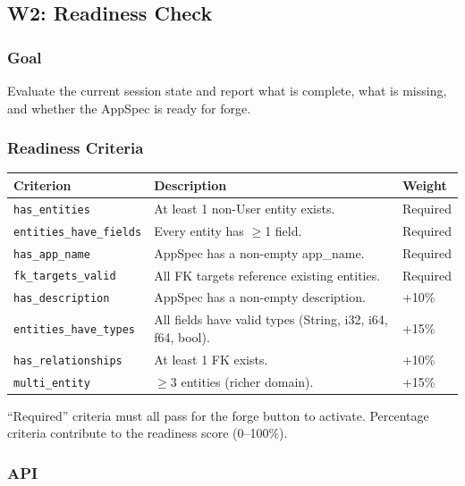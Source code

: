 \documentclass[11pt,a4paper]{article}
\begin{document}
\subsection{W2: Readiness Check}
\label{sec:w2}

\subsubsection{Goal}

Evaluate the current session state and report what is complete, 
what is missing, and whether the AppSpec is ready for forge.

\subsubsection{Readiness Criteria}

\begin{longtable}{lp{8cm}l}
\toprule
\textbf{Criterion} & \textbf{Description} & \textbf{Weight} \\
\midrule
\texttt{has\_entities}
  & At least 1 non-User entity exists.
  & Required \\
\texttt{entities\_have\_fields}
  & Every entity has $\geq$1 field.
  & Required \\
\texttt{has\_app\_name}
  & AppSpec has a non-empty app\_name.
  & Required \\
\texttt{fk\_targets\_valid}
  & All FK targets reference existing entities.
  & Required \\
\texttt{has\_description}
  & AppSpec has a non-empty description.
  & +10\% \\
\texttt{entities\_have\_types}
  & All fields have valid types (String, i32, i64, f64, bool).
  & +15\% \\
\texttt{has\_relationships}
  & At least 1 FK exists.
  & +10\% \\
\texttt{multi\_entity}
  & $\geq$3 entities (richer domain).
  & +15\% \\
\bottomrule
\end{longtable}

``Required'' criteria must all pass for the forge button to activate.
Percentage criteria contribute to the readiness score (0--100\%).

\subsubsection{API}
\end{document}
